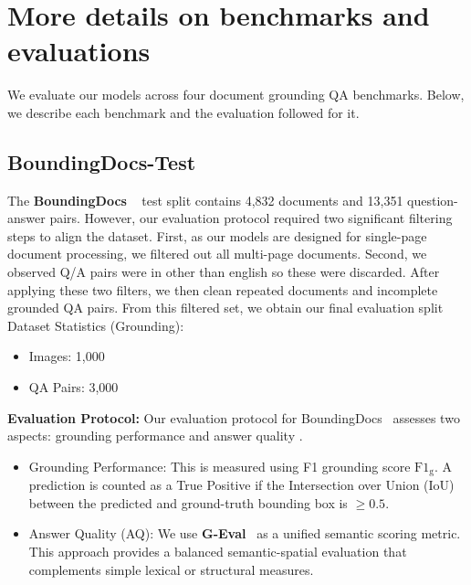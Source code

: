 \section{More details on benchmarks and evaluations}
\label{sec:benchmarks}

We evaluate our models across four document grounding QA benchmarks. Below, we describe each benchmark and the evaluation followed for it.

\subsection{BoundingDocs-Test}
\label{sec:dataset_boundingdocs}

The \textbf{BoundingDocs} ~\cite{giovannini2025boundingdocs} test split contains 4,832 documents and 13,351 question-answer pairs. However, our evaluation protocol required two significant filtering steps to align the dataset. 
First, as our models are designed for single-page document processing, we filtered out all multi-page documents. Second, we observed Q/A pairs were in other than english so these were discarded. After applying these two filters, we then clean repeated documents and incomplete grounded QA pairs. From this filtered set, we obtain our final evaluation split 
\noindent Dataset Statistics (Grounding): 
\begin{itemize}
    \item Images: 1,000
    \item QA Pairs: 3,000
\end{itemize}


\noindent \textbf{Evaluation Protocol:} Our evaluation protocol for BoundingDocs~\cite{giovannini2025boundingdocs} assesses two aspects: grounding performance and answer quality \cite{zheng2023judging,li2024llms,tong2025g}. 
\begin{itemize}
    \item Grounding Performance: This is measured using F1 grounding score $\text{F1}_{\text{g}}$. A prediction is counted as a True Positive if the Intersection over Union (IoU) between the predicted and ground-truth bounding box is $\geq 0.5$.
    \item Answer Quality (AQ): We use \textbf{G-Eval}~\cite{liu2023geval} as a unified semantic scoring metric. This approach provides a balanced semantic-spatial evaluation that complements simple lexical or structural measures.
\end{itemize}


